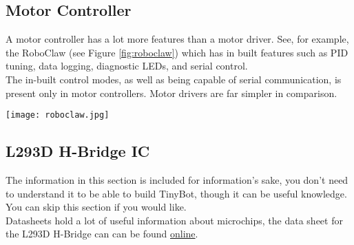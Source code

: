 \documentclass[../TinyBot.tex]{subfiles}
\begin{document}
\subsection{Motor Controller}

\begin{minipage}[t]{0.7\textwidth}\vspace{0pt}
    A motor controller has a lot more features than a motor driver. See, for example, the RoboClaw
    (see Figure \ref{fig:roboclaw}) which has in built features such as PID tuning, data logging,
    diagnostic LEDs, and serial control. \\
    
    The in-built control modes, as well as being capable of serial communication, is present only
    in motor controllers. Motor drivers are far simpler in comparison. \\
\end{minipage}

\begin{minipage}[t]{0.3\textwidth}\vspace{0pt}
    \centering
    \texttt{[image: roboclaw.jpg]}
    \label{fig:roboclaw}
\end{minipage}

\pagebreak
\subsection{L293D H-Bridge IC}

The information in this section is included for information's sake, you don't need to
understand it to be able to build TinyBot, though it can be useful knowledge.
You can skip this section if you would like. \\

Datasheets hold a lot of useful information about microchips, the data sheet for the L293D
H-Bridge can can be found \href{https://www.altronics.com.au/p/z2900-l293d-motor-drive-ic/}{online}.




        
\end{document}
